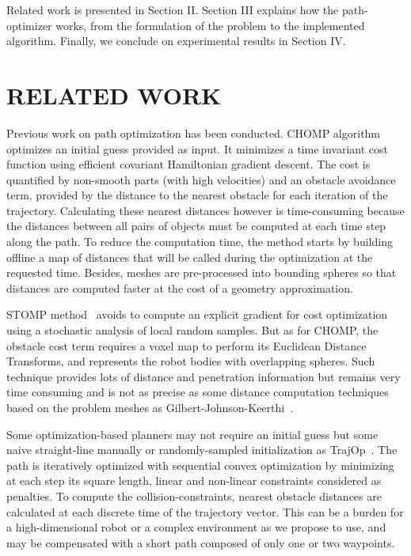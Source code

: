 \documentclass{tADR2e}
\begin{document}
Related work is presented in Section II. Section III explains how the 
path-optimizer works, from the formulation of the problem to the implemented
algorithm. Finally, we conclude on experimental results in Section IV.

\section{RELATED WORK}
Previous work on path optimization has been conducted. CHOMP algorithm~\cite{chompIjrr} optimizes an initial guess provided as
input. It minimizes a time invariant cost function using efficient covariant
Hamiltonian gradient descent. The cost is quantified by non-smooth parts (with
high velocities) and an obstacle avoidance term, provided by the distance to the 
nearest obstacle for each iteration of the trajectory. Calculating these nearest 
distances however is time-consuming because the distances between all pairs of 
objects must be computed at each time step along the path. To reduce the 
computation time, the method starts by building offline a map of distances that 
will be called during the optimization at the requested time. Besides, meshes 
are pre-processed into bounding spheres so that distances are computed faster 
at the cost of a geometry approximation.

STOMP method~\cite{KalakrishnanStomp} avoids to compute an 
explicit gradient for cost optimization using a stochastic analysis of local 
random samples. But as for CHOMP, the obstacle cost term requires a voxel map to 
perform its Euclidean Distance Transforms, and represents the robot bodies with 
overlapping spheres. Such technique provides lots of distance and penetration 
information but remains very time consuming and is not as precise as some 
distance computation techniques based on the problem meshes as 
Gilbert-Johnson-Keerthi~\cite{gilbertGjk}.

Some optimization-based planners may not require an initial guess but some naive 
straight-line manually or randomly-sampled initialization as 
TrajOp~\cite{SchulmanConvexOptim}. The path is iteratively optimized with 
sequential convex optimization by minimizing at each step its square length, 
linear and non-linear constraints considered as penalties. To compute the 
collision-constraints, nearest obstacle distances are calculated at each discrete 
time of the trajectory vector. This can be a burden for a high-dimensional robot 
or a complex environment as we propose to use, and may be compensated with a 
short path composed of only one or two waypoints.
\end{document}
